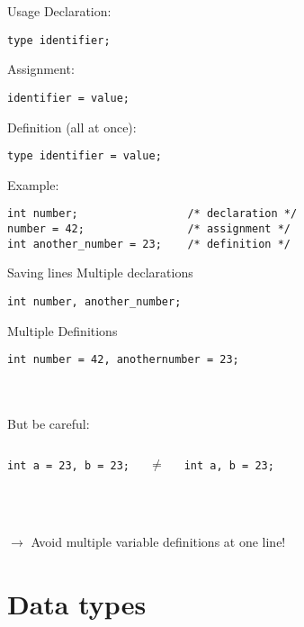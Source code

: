 \begin{frame}[fragile]{Usage}
	Declaration:
	\begin{lstlisting}[numbers=none,basicstyle=\itshape\footnotesize]
type identifier;
\end{lstlisting}
	Assignment: 
	\begin{lstlisting}[numbers=none,basicstyle=\itshape\footnotesize]
identifier = value;
\end{lstlisting}
	Definition (all at once):
	\begin{lstlisting}[numbers=none,basicstyle=\itshape\footnotesize]
type identifier = value;
\end{lstlisting}
	Example:
	\begin{lstlisting}[numbers=none]
int number;					/* declaration */
number = 42;				/* assignment */
int another_number = 23;	/* definition */

\end{lstlisting}
\end{frame}
\begin{frame}[fragile]{Saving lines}
	Multiple declarations
	\begin{lstlisting}[numbers=none]
int number, another_number;
\end{lstlisting}
	Multiple Definitions
	\begin{lstlisting}[numbers=none]
int number = 42, anothernumber = 23;
\end{lstlisting}\ \\\ \\
But be careful:
\begin{columns}[c]
	\begin{lstlisting}[numbers=none]
int a = 23, b = 23;
\end{lstlisting}
	\centering
	$\neq$
	\begin{lstlisting}[numbers=none]
int a, b = 23;
\end{lstlisting}
\end{columns}\ \\ \ \\
$\rightarrow$ Avoid multiple variable definitions at one line!
\end{frame}



\section{Data types}
